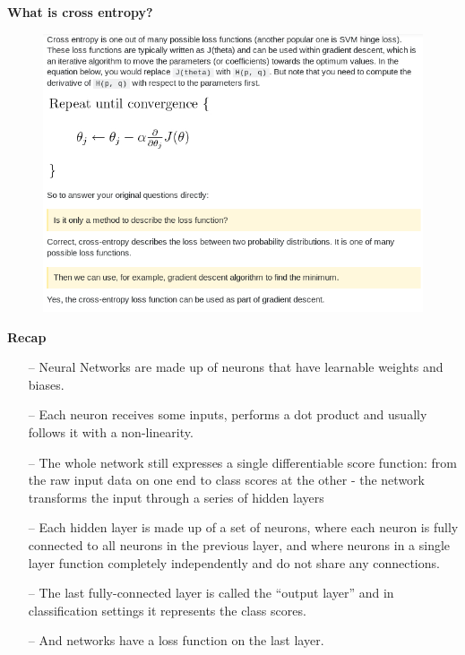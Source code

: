 \documentclass[10pt, compress]{beamer}
\begin{document}
\begin{frame}
  \vspace{.6cm}
  \textbf{What is cross entropy?} \\
  \begin{figure}
    \includegraphics[width=.8\linewidth, left]{imgs/cross_entropy_2}
  \end{figure}
\end{frame}

\begin{frame}
  \vspace{1cm}
  \textbf{Recap} \\
  \begin{itemize}
    \item[--] Neural Networks are made up of neurons that have learnable weights and biases.
    \item[--] Each neuron receives some inputs, performs a dot product and usually follows it with a non-linearity.
    \item[--] The whole network still expresses a single differentiable score function: from the raw input data on one end to class scores at the other - the network transforms the input through a series of hidden layers
    \item[--] Each hidden layer is made up of a set of neurons, where each neuron is fully connected to all neurons in the previous layer, and where neurons in a single layer function completely independently and do not share any connections.
    \item[--] The last fully-connected layer is called the “output layer” and in classification settings it represents the class scores.
    \item[--] And networks have a loss function on the last layer.
  \end{itemize}

\end{frame}
\end{document}
